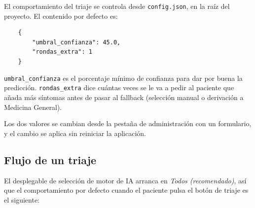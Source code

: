 El comportamiento del triaje se controla desde \texttt{config.json}, en la raíz del proyecto. El contenido por defecto es:

\begin{verbatim}
	{
		"umbral_confianza": 45.0,
		"rondas_extra": 1
	}
\end{verbatim}

\texttt{umbral\_confianza} es el porcentaje mínimo de confianza para dar por buena la predicción. \texttt{rondas\_extra} dice cuántas veces se le va a pedir al paciente que añada más síntomas antes de pasar al fallback (selección manual o derivación a Medicina General).

Los dos valores se cambian desde la pestaña de administración con un formulario, y el cambio se aplica sin reiniciar la aplicación.

\subsection{Flujo de un triaje}

El desplegable de selección de motor de IA arranca en \textit{Todos (recomendado)}, así que el comportamiento por defecto cuando el paciente pulsa el botón de triaje es el siguiente:


